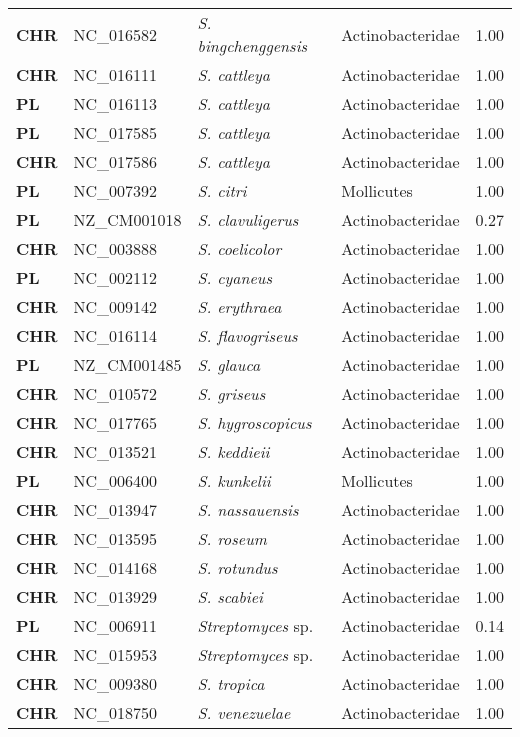 \begin{adjustwidth}{-3cm}{2cm}
{\begin{supertabular}{>{\bfseries}l|p{0.1\textwidth}p{0.14\textwidth}l|l}
CHR & NC\_016582 & \textit{S. bingchenggensis} & Actinobacteridae & 1.00\\
CHR & NC\_016111 & \textit{S. cattleya} & Actinobacteridae & 1.00\\
PL & NC\_016113 & \textit{S. cattleya} & Actinobacteridae & 1.00\\
PL & NC\_017585 & \textit{S. cattleya} & Actinobacteridae & 1.00\\
CHR & NC\_017586 & \textit{S. cattleya} & Actinobacteridae & 1.00\\
PL & NC\_007392 & \textit{S. citri} & Mollicutes & 1.00\\
PL & NZ\_CM001018 & \textit{S. clavuligerus} & Actinobacteridae & 0.27\\
CHR & NC\_003888 & \textit{S. coelicolor} & Actinobacteridae & 1.00\\
PL & NC\_002112 & \textit{S. cyaneus} & Actinobacteridae & 1.00\\
CHR & NC\_009142 & \textit{S. erythraea} & Actinobacteridae & 1.00\\
CHR & NC\_016114 & \textit{S. flavogriseus} & Actinobacteridae & 1.00\\
PL & NZ\_CM001485 & \textit{S. glauca} & Actinobacteridae & 1.00\\
CHR & NC\_010572 & \textit{S. griseus} & Actinobacteridae & 1.00\\
CHR & NC\_017765 & \textit{S. hygroscopicus} & Actinobacteridae & 1.00\\
CHR & NC\_013521 & \textit{S. keddieii} & Actinobacteridae & 1.00\\
PL & NC\_006400 & \textit{S. kunkelii} & Mollicutes & 1.00\\
CHR & NC\_013947 & \textit{S. nassauensis} & Actinobacteridae & 1.00\\
CHR & NC\_013595 & \textit{S. roseum} & Actinobacteridae & 1.00\\
CHR & NC\_014168 & \textit{S. rotundus} & Actinobacteridae & 1.00\\
CHR & NC\_013929 & \textit{S. scabiei} & Actinobacteridae & 1.00\\
PL & NC\_006911 & \textit{Streptomyces} sp. & Actinobacteridae & 0.14\\
CHR & NC\_015953 & \textit{Streptomyces} sp. & Actinobacteridae & 1.00\\
CHR & NC\_009380 & \textit{S. tropica} & Actinobacteridae & 1.00\\
CHR & NC\_018750 & \textit{S. venezuelae} & Actinobacteridae & 1.00\\

\end{supertabular}}
\end{adjustwidth}
